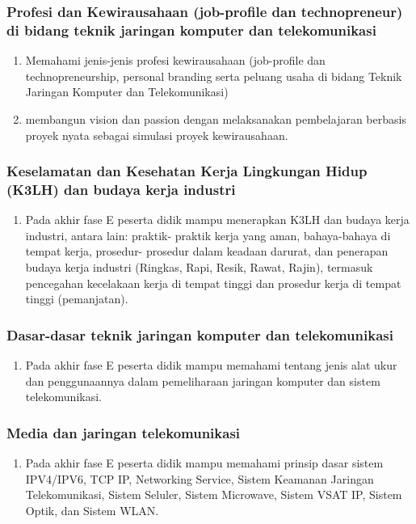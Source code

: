 \documentclass[11pt]{article}
\begin{document}
\subsubsection{Profesi dan Kewirausahaan (job-profile  dan technopreneur) di bidang teknik jaringan komputer dan telekomunikasi}
\label{sec:org5b81559}
\begin{enumerate}
\item Memahami jenis-jenis profesi kewirausahaan (job-profile dan technopreneurship, personal branding serta peluang usaha di bidang Teknik Jaringan Komputer dan Telekomunikasi)
\label{sec:org9485f55}
\item membangun vision dan passion dengan melaksanakan pembelajaran berbasis proyek nyata sebagai simulasi proyek kewirausahaan.
\label{sec:org4a98150}
\end{enumerate}
\subsubsection{Keselamatan dan Kesehatan Kerja Lingkungan Hidup (K3LH) dan budaya kerja industri}
\label{sec:org6d143c4}
\begin{enumerate}
\item Pada akhir fase E peserta didik mampu menerapkan K3LH dan budaya kerja industri, antara lain: praktik- praktik kerja yang aman, bahaya-bahaya di tempat kerja, prosedur- prosedur dalam keadaan darurat, dan penerapan budaya kerja industri (Ringkas, Rapi, Resik, Rawat, Rajin), termasuk pencegahan kecelakaan kerja di tempat tinggi dan prosedur kerja di tempat tinggi (pemanjatan).
\label{sec:orgb2f42f2}
\end{enumerate}

\subsubsection{Dasar-dasar teknik jaringan komputer dan telekomunikasi}
\label{sec:orgf5aa857}
\begin{enumerate}
\item Pada akhir fase E peserta didik mampu memahami tentang jenis alat ukur dan penggunaannya dalam pemeliharaan jaringan komputer dan sistem telekomunikasi.
\label{sec:org2921244}
\end{enumerate}
\subsubsection{Media dan jaringan telekomunikasi}
\label{sec:org40cb8b0}
\begin{enumerate}
\item Pada akhir fase E peserta didik mampu memahami prinsip dasar sistem IPV4/IPV6, TCP IP, Networking Service, Sistem Keamanan Jaringan Telekomunikasi, Sistem Seluler, Sistem Microwave, Sistem VSAT IP, Sistem Optik, dan Sistem WLAN.
\label{sec:orgc2a9326}
\end{enumerate}
\end{document}
